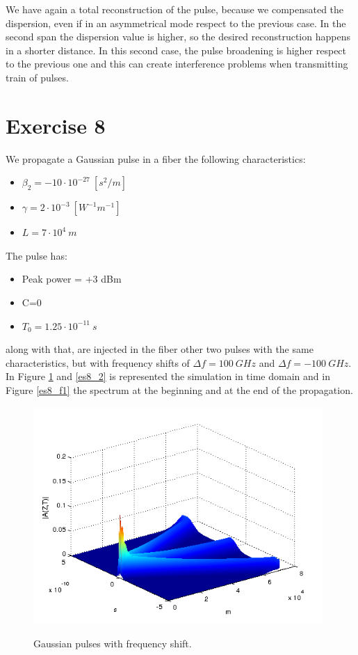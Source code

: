 \documentclass[a4paper,10pt]{report}
\begin{document}
We have again a total reconstruction of the pulse, because we compensated the dispersion, even if in an asymmetrical mode
respect to the previous case. In the second span the dispersion value is higher, so the desired reconstruction happens in a shorter distance.
In this second case, the pulse broadening is higher respect to the previous one and this can create interference problems
when transmitting train of pulses.


\newpage
\section*{Exercise 8}
We propagate a Gaussian pulse in a fiber the following characteristics:
\begin{itemize}
 \item $\beta_2 = -10 \cdot 10^{-27} \ [s^2/m]$
 \item $\gamma = 2 \cdot 10^{-3} \ [W^{-1} m^{-1}]$
 \item $L=7 \cdot 10^4 \ m$
\end{itemize}

The pulse has:
\begin{itemize}
 \item Peak power = +3 dBm
 \item C=0
 \item $T_0=1.25 \cdot 10^{-11} \ s$
\end{itemize}
along with that, are injected in the fiber other two pulses with the same characteristics, but with frequency shifts of $\Delta f=100 \ GHz$
and $\Delta f = -100 \ GHz$.
In Figure \ref{es8_1} and \ref{es8_2} is represented the simulation in time domain and in Figure \ref{es8_f1} the spectrum at the beginning
and at the end of the propagation.

\begin{figure}[!ht]
  \centering
  \includegraphics[width=11cm]{es8_1.png}\\
  \caption{Gaussian pulses with frequency shift.}
  \label{es8_1}
\end{figure}
\end{document}
